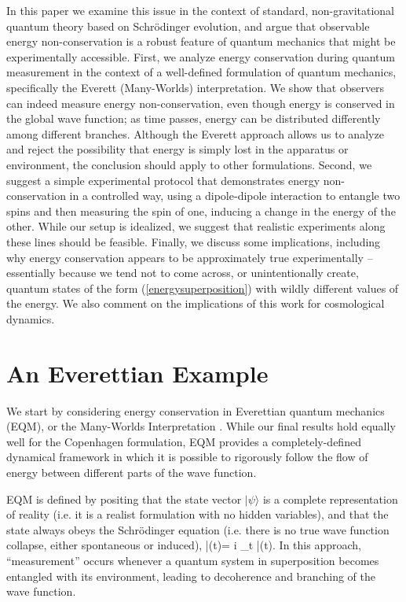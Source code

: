 \documentclass[aps,prd,onecolumn,nofootinbib,notitlepage]{revtex4-1}
\begin{document}
In this paper we examine this issue in the context of standard, non-gravitational quantum theory based on Schr\"odinger evolution, and argue that observable energy non-conservation is a robust feature of quantum mechanics that might be experimentally accessible.
First, we analyze energy conservation during quantum measurement in the context of a well-defined formulation of quantum mechanics, specifically the Everett (Many-Worlds) interpretation.
We show that observers can indeed measure energy non-conservation, even though energy is conserved in the global wave function; as time passes, energy can be distributed differently among different branches.
Although the Everett approach allows us to analyze and reject the possibility that energy is simply lost in the apparatus or environment, the conclusion should apply to other formulations.
Second, we suggest a simple experimental protocol that demonstrates energy non-conservation in a controlled way, using a dipole-dipole interaction to entangle two spins and then measuring the spin of one, inducing a change in the energy of the other.
While our setup is idealized, we suggest that realistic experiments along these lines should be feasible.
Finally, we discuss some implications, including why energy conservation appears to be approximately true experimentally -- essentially because we tend not to come across, or unintentionally create, quantum states of the form (\ref{energysuperposition}) with wildly different values of the energy.
We also comment on the implications of this work for cosmological dynamics.

\section{An Everettian Example}

We start by considering energy conservation in Everettian quantum mechanics (EQM), or the Many-Worlds Interpretation \cite{Everett:1957hd,Wallace:2012zla}.
While our final results hold equally well for the Copenhagen formulation, EQM provides a completely-defined dynamical framework in which it is possible to rigorously follow the flow of energy between different parts of the wave function.

EQM is defined by positing that the state vector $|\psi\rangle$ is a complete representation of reality (i.e. it is a realist formulation with no hidden variables), and that the state always obeys the Schr\"odinger equation (i.e. there is no true wave function collapse, either spontaneous or induced),
\be
  \ham |\psi(t)\rangle = i \partial_t |\psi(t)\rangle.
\ee
In this approach, ``measurement'' occurs whenever a quantum system in superposition becomes entangled with its environment, leading to decoherence and branching of the wave function.
\end{document}
